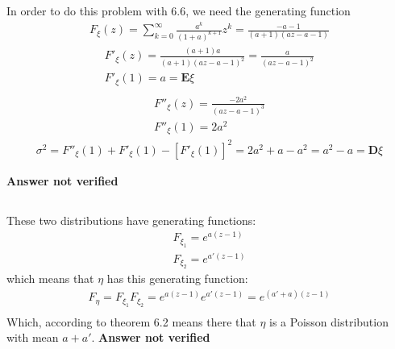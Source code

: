 \subsection{}
In order to do this problem with 6.6, we need the generating function
\begin{eqnarray}
	F_{\xi}(z) = \sum_{k=0}^{\infty} \frac{ a^k }{(1+a)^{k+1}} z^k = \frac{-a-1}{(a+1) (a z-a-1)}
\end{eqnarray}
\begin{eqnarray}
	F'_{\xi}(z) = \frac{(a+1) a}{(a+1) (a z-a-1)^2} = \frac{a}{(a z-a-1)^2} \\
	F'_{\xi}(1) = a =  \textbf{E}\xi\\
\end{eqnarray}
\begin{eqnarray}
	F''_{\xi}(z) = \frac{-2 a^2}{(a z-a-1)^3} \\
	F''_{\xi}(1) = 2 a^2
\end{eqnarray}
\begin{eqnarray}
	\sigma^2 = F''_{\xi}(1) + F'_{\xi}(1) - [F'_{\xi}(1)]^2  = 2 a^2 + a - a^2 = a^2 - a = \textbf{D}\xi
\end{eqnarray}

\textbf{Answer not verified}


\subsection{}
These two distributions have generating functions:
\begin{eqnarray}
	F_{\xi_1} = e^{a(z-1)} \\
	F_{\xi_2} = e^{a'(z-1)}
\end{eqnarray}
which means that $\eta$ has this generating function:
\begin{eqnarray}
	F_{\eta} =F_{\xi_1}F_{\xi_2} = e^{a(z-1)}e^{a'(z-1)} = e^{(a'+ a)(z-1)}  \\
\end{eqnarray}
Which, according to theorem 6.2 means there that $\eta$ is a Poisson distribution with mean $a+a'$.
\textbf{Answer not verified}


